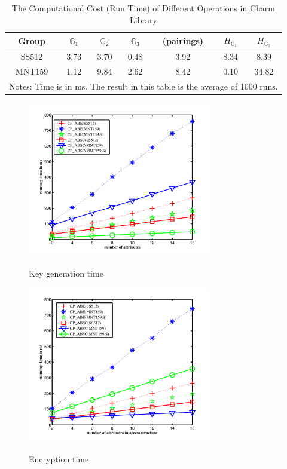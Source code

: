\documentclass[letterpaper,12pt]{article}
\newcommand{\Gone}{\mathbb{G}_1}
\newcommand{\Gtwo}{\mathbb{G}_2}
\newcommand{\Gthree}{\mathbb{G}_3}
\begin{document}
\begin{table}[tb]
\caption{The Computational Cost (Run Time) of Different Operations in Charm Library}\label{table:charmBenchmark}
\centering
\begin{tabular}{c|c|c|c|c|c|c}
\hline
Group & $\Gone$ & $\Gtwo$ & $\Gthree$ & (pairings) & $H_{\Gone}$ & $H_{\Gtwo}$ \\
\hline
SS512 &  3.73 & 3.70 & 0.48 & 3.92 & 8.34 & 8.39\\
MNT159 & 1.12 & 9.84 & 2.62 & 8.42 & 0.10 & 34.82\\
\hline
\multicolumn{7}{p{8cm}}{Notes: Time is in ms. The result in this table is the average of 1000 runs.}
\end{tabular}
\end{table}

\begin{figure}[!htp]\centering
  \includegraphics[width=8cm]{KeyGeneration}\\
  \caption{Key generation time}\label{sec:Fig:Key Generation time}
\end{figure}
%
%
\begin{figure}[!htp]\centering
  \includegraphics[width=8cm]{Encryption}\\
  \caption{Encryption time} \label{sec:Fig:Encryption time}
\end{figure}
\end{document}
